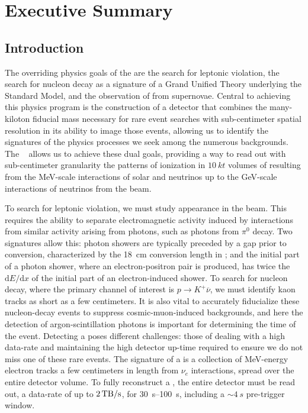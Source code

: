 \chapter{Executive Summary}
\label{ch:fdsp-execsum}

\section{Introduction}
\label{sec:fdsp-exec-introduction}


The overriding physics goals of the  are the search for leptonic  violation, the search for nucleon decay as a signature of a Grand Unified Theory underlying the Standard Model, and the observation of   from supernovae. Central to achieving this physics program is the construction of a detector that combines the many-kiloton fiducial mass necessary for rare event searches with sub-centimeter spatial resolution in its ability to image those events, allowing us to identify the signatures of the physics processes we seek among the numerous backgrounds. The  ~\cite{Rubbia:1977zz} allows us to achieve these dual goals, providing a way to read out with sub-centimeter granularity the patterns of ionization in $\SI{10}{kt}$ volumes of  resulting from the \si{\mega\electronvolt}-scale interactions of solar and  neutrinos up to the \si{\giga\electronvolt}-scale interactions of neutrinos from the  beam.

To search for leptonic  violation, we must study \nue appearance in the  \numu beam. This requires the ability to separate electromagnetic activity induced by  \nue interactions from similar activity arising from photons, such as photons from $\pi^{0}$ decay. Two signatures allow this: photon showers are typically preceded by a gap prior to conversion, characterized by the \SI{18}{cm} conversion length in ; and the initial part of a photon shower, where an electron-positron pair is produced, has twice the $\mathrm{d}E/\mathrm{d}x$ of the initial part of an electron-induced shower. To search for nucleon decay, where the primary channel of interest is $p\rightarrow K^{+}\overline{\nu}$, we must identify kaon tracks as short as a few centimeters. It is also vital to accurately fiducialize these nucleon-decay events to suppress cosmic-muon-induced backgrounds, and here the detection of argon-scintillation photons is important for determining the time of the event. Detecting a  poses different challenges: those of dealing with a high data-rate and maintaining the high detector up-time required to ensure we do not miss one of these rare events. The signature of a  is a collection of MeV-energy electron tracks a few centimeters in length from  $\nu_{e}$ interactions, spread over the entire detector volume. To fully reconstruct a , the entire detector must be read out, a data-rate of up to $\SI{2}{\tera\byte/\second}$, for \SIrange{30}{100}{s}, including a $\sim\!\SI{4}{s}$ pre-trigger window.

